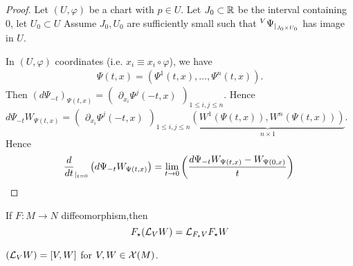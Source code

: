 \begin{proof}
    Let \((U,\varphi)\) be a chart with \(p\in U\). Let \(J_0\subset \mathbb{R}\) be the interval containing \(0\), let \(U_0\subset U\)
    Assume \(J_0,U_0\) are sufficiently small such that \( {}^V \Psi_{|_{J_0\times U_0}}\)
    has image in \(U\).

    In \((U,\varphi)\) coordinates (i.e. \(x_i\equiv x_i\circ \varphi\)), we have 
    \begin{align*}
        \Psi(t,x)=(\Psi^1(t,x),\dots,\Psi^{n}(t,x)).
    \end{align*}
    Then \((d\Psi_{-t})_{\Psi(t,x)}=\begin{pmatrix}
        \partial_{x_i}\Psi^{j}(-t,x)
    \end{pmatrix}_{1\leq i,j\leq n}\). Hence 
    \(d\Psi_{-t}W_{\Psi(t,x)}=\begin{pmatrix}
        \partial_{x_i}\Psi^{j}(-t,x)
    \end{pmatrix}_{1\leq i,j\leq n} \underbrace{(W^1(\Psi(t,x)),W^n(\Psi(t,x)))}_{n\times 1}\).
    Hence \[\frac{d}{dt}_{|_{t=0}}\left(d\Psi_{-t}W_{\Psi(t,x)} \right)=\lim_{t\to 0}\left(\frac{d\Psi_{-t}W_{\Psi(t,x)}-W_{\Psi(0,x)}}{t}\right)\qedhere\]
\end{proof}

\begin{remark}
    If \(F:M\to N\) diffeomorphism,then 
    \[F_\star(\mathcal{L}_VW)=\mathcal{L}_{F_\star V}F_\star W\]
\end{remark}

\begin{proposition}\label{prop:7.14}
    \((\mathcal{L}_VW)=[V,W]\) for \(V,W\in\mathcal{X}(M)\).
\end{proposition}




